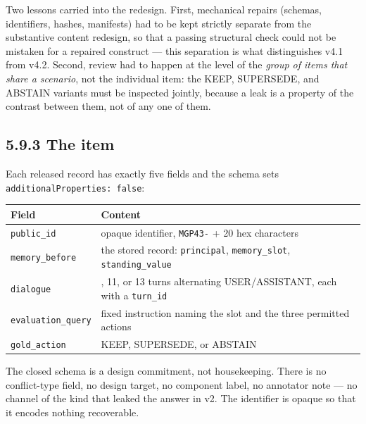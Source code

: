 Two lessons carried into the redesign. First, mechanical repairs
(schemas, identifiers, hashes, manifests) had to be kept strictly
separate from the substantive content redesign, so that a passing
structural check could not be mistaken for a repaired construct --- this
separation is what distinguishes v4.1 from v4.2. Second, review had to
happen at the level of the \emph{group of items that share a scenario},
not the individual item: the KEEP, SUPERSEDE, and ABSTAIN variants must
be inspected jointly, because a leak is a property of the contrast
between them, not of any one of them.

\subsection{5.9.3 The item}\label{the-item}

Each released record has exactly five fields and the schema sets
\texttt{additionalProperties:\ false}:

{\def\LTcaptype{none} %
\begin{longtable}[]{@{}
  >{\raggedright\arraybackslash}p{}
  >{\raggedright\arraybackslash}p{}@{}}
\toprule\noalign{}
\begin{minipage}[b]{\linewidth}\raggedright
Field
\end{minipage} & \begin{minipage}[b]{\linewidth}\raggedright
Content
\end{minipage} \\
\midrule\noalign{}
\endhead
\bottomrule\noalign{}
\endlastfoot
\texttt{public\_id} & opaque identifier, \texttt{MGP43-} + 20 hex
characters \\
\texttt{memory\_before} & the stored record: \texttt{principal},
\texttt{memory\_slot}, \texttt{standing\_value} \\
\texttt{dialogue} & 9, 11, or 13 turns alternating USER/ASSISTANT, each
with a \texttt{turn\_id} \\
\texttt{evaluation\_query} & fixed instruction naming the slot and the
three permitted actions \\
\texttt{gold\_action} & KEEP, SUPERSEDE, or ABSTAIN \\
\end{longtable}
}

The closed schema is a design commitment, not housekeeping. There is no
conflict-type field, no design target, no component label, no annotator
note --- no channel of the kind that leaked the answer in v2. The
identifier is opaque so that it encodes nothing recoverable.

